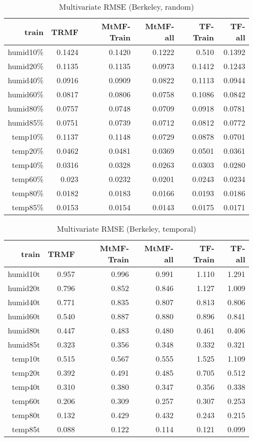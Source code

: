 \begin{table}[htbp]
\setlength{\tabcolsep}{2pt}
\centering
\caption{Multivariate RMSE (Berkeley, random)}
\label{table:multi_berkeley_random}
\begin{tabular}{r | r r r r r}
train	&TRMF	&MtMF-Train	&MtMF-all &TF-Train & TF-all \\ \hline
humid10\%	&0.1424	&0.1420	&0.1222 &0.510&0.1392\\
humid20\%	&0.1135	&0.1135	&0.0973&0.1412&0.1243\\
humid40\%	&0.0916	&0.0909	&0.0822&0.1113&0.0944\\
humid60\%	&0.0817	&0.0806	&0.0758&0.1086&0.0842\\
humid80\%	&0.0757	&0.0748	&0.0709&0.0918&0.0781\\
humid85\%	&0.0751	&0.0739	&0.0712&0.0812&0.0772\\ \hline
 temp10\%	&0.1137	&0.1148	&0.0729&0.0878&0.0701\\
 temp20\%	&0.0462	&0.0481	&0.0369&0.0501&0.0361\\
 temp40\%	&0.0316	&0.0328	&0.0263&0.0303&0.0280\\
 temp60\%	&0.023	&0.0232	&0.0201&0.0243&0.0234\\
 temp80\%	&0.0182	&0.0183	&0.0166&0.0193&0.0186\\
 temp85\%	&0.0153	&0.0154	&0.0143&0.0175&0.0171\\
\end{tabular}
\end{table}

\begin{table}[htbp]
\setlength{\tabcolsep}{2pt}
\centering
\caption{Multivariate RMSE (Berkeley, temporal)}
\label{table:multi_berkeley_temporal}
\begin{tabular}{r | r r r r r}
train	&TRMF	&MtMF-Train	&MtMF-all &TF-Train&TF-all \\ \hline
humid10t	&0.957&0.996& 	0.991&1.110&1.291\\
humid20t	&0.796&0.852& 	0.846&1.127&1.009\\
humid40t	&0.771&0.835& 	0.807&0.813&0.806\\
humid60t	&0.540&0.887& 	0.880&0.896&0.841\\
humid80t	&0.447&0.483& 	0.480&0.461&0.406\\
humid85t	&0.323&0.356& 	0.348&0.332&0.321\\	\hline
 temp10t	&0.515&0.567& 	0.555&1.525&1.109\\
 temp20t	&0.392&0.491& 	0.485&0.705&0.512\\
 temp40t	&0.310&0.380& 	0.347&0.356&0.338\\
 temp60t	&0.206&0.309& 	0.257&0.307&0.253\\
 temp80t	&0.132&0.429& 	0.432&0.243&0.215\\
 temp85t	&0.088&0.122& 	0.114&0.121&0.099\\
\end{tabular}
\end{table}

